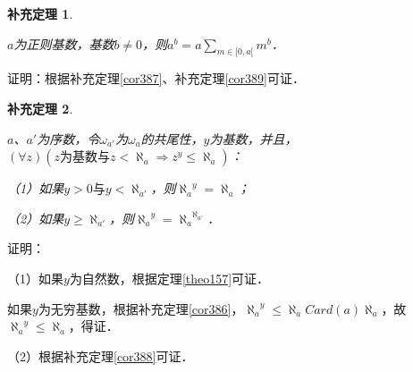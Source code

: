 \documentclass[12pt, a4paper, oneside]{book}
\newtheorem{cor}{补充定理}
\begin{document}
			\begin{cor}\label{cor390}
				\hfill\par
				$a$为正则基数，基数$b\neq 0$，则$a^b=a\sum\limits_{m\in [0, a[}m^b$．
			\end{cor}
			证明：根据补充定理\ref{cor387}、补充定理\ref{cor389}可证．
			
			\begin{cor}\label{cor391}
				\hfill\par
				$a$、$a'$为序数，令$\omega_{a'}$为$\omega_a$的共尾性，$y$为基数，并且，$(\forall z)(z\text{为基数}\text{与}z<\aleph_a\Rightarrow z^y\leq \aleph_a)$：
				\par
				（1）如果$y>0\text{与}y<\aleph_{a'}$，则${\aleph_a}^y=\aleph_a$；
				\par
				（2）如果$y\geq \aleph_{a'}$，则${\aleph_a}^y={\aleph_a}^{\aleph_{a'}}$．
			\end{cor}
			证明：
			\par
			（1）如果$y$为自然数，根据定理\ref{theo157}可证．
			\par
			如果$y$为无穷基数，根据补充定理\ref{cor386}，${\aleph_a}^y\leq \aleph_aCard(a)\aleph_a$，故${\aleph_a}^y\leq \aleph_a$，得证．
			\par
			（2）根据补充定理\ref{cor388}可证．
			
\end{document}
